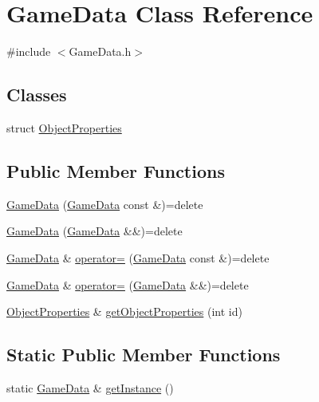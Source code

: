 \hypertarget{class_game_data}{}\section{Game\+Data Class Reference}
\label{class_game_data}


{\ttfamily \#include $<$Game\+Data.\+h$>$}

\subsection*{Classes}
\begin{DoxyCompactItemize}
\item 
struct \hyperlink{struct_game_data_1_1_object_properties}{Object\+Properties}
\end{DoxyCompactItemize}
\subsection*{Public Member Functions}
\begin{DoxyCompactItemize}
\item 
\hyperlink{class_game_data_a0361292205caafffd2810013c2fef134}{Game\+Data} (\hyperlink{class_game_data}{Game\+Data} const \&)=delete
\item 
\hyperlink{class_game_data_af4225d69d56095e6d1a6d3bdeba8602f}{Game\+Data} (\hyperlink{class_game_data}{Game\+Data} \&\&)=delete
\item 
\hyperlink{class_game_data}{Game\+Data} \& \hyperlink{class_game_data_af68a0e80d4eaf087f85c41731aec3713}{operator=} (\hyperlink{class_game_data}{Game\+Data} const \&)=delete
\item 
\hyperlink{class_game_data}{Game\+Data} \& \hyperlink{class_game_data_a7727619253e644dde96794e47ff9ff27}{operator=} (\hyperlink{class_game_data}{Game\+Data} \&\&)=delete
\item 
\hyperlink{struct_game_data_1_1_object_properties}{Object\+Properties} \& \hyperlink{class_game_data_acf4e9f7e0bbd359c54d048ccdbbdcd2b}{get\+Object\+Properties} (int id)
\end{DoxyCompactItemize}
\subsection*{Static Public Member Functions}
\begin{DoxyCompactItemize}
\item 
static \hyperlink{class_game_data}{Game\+Data} \& \hyperlink{class_game_data_a5930d5371cde0a43f4fa05b6b7152bb8}{get\+Instance} ()
\end{DoxyCompactItemize}



